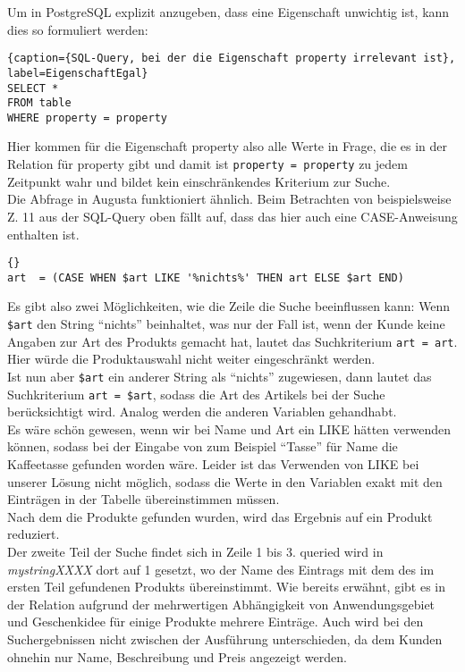 Um in PostgreSQL explizit anzugeben, dass eine Eigenschaft unwichtig ist, kann dies so formuliert werden:
\begin{lstlisting}{caption={SQL-Query, bei der die Eigenschaft property irrelevant ist}, label=EigenschaftEgal}
SELECT *
FROM table
WHERE property = property
\end{lstlisting}
Hier kommen für die Eigenschaft property also alle Werte in Frage, die es in der Relation für property gibt und damit ist \lstinline{property = property} zu jedem Zeitpunkt wahr und bildet kein einschränkendes Kriterium zur Suche.\\
Die Abfrage in Augusta funktioniert ähnlich. Beim Betrachten von beispielsweise Z. 11 aus der SQL-Query oben fällt auf, dass das hier auch eine CASE-Anweisung enthalten ist.
\begin{lstlisting}{}
art  = (CASE WHEN $art LIKE '%nichts%' THEN art ELSE $art END)
\end{lstlisting}
Es gibt also zwei Möglichkeiten, wie die Zeile die Suche beeinflussen kann: Wenn \lstinline|$art| den String "`nichts"' beinhaltet, was nur der Fall ist, wenn der Kunde keine Angaben zur Art des Produkts gemacht hat, lautet das Suchkriterium \lstinline|art = art|. Hier würde die Produktauswahl nicht weiter eingeschränkt werden.\\
Ist nun aber \lstinline|$art| ein anderer String als "`nichts"' zugewiesen, dann lautet das Suchkriterium \lstinline|art = $art|, sodass die Art des Artikels bei der Suche berücksichtigt wird. Analog werden die anderen Variablen gehandhabt.\\
Es wäre schön gewesen, wenn wir bei Name und Art ein LIKE hätten verwenden können, sodass bei der Eingabe von zum Beispiel "`Tasse"' für Name die Kaffeetasse gefunden worden wäre. Leider ist das Verwenden von LIKE bei unserer Lösung nicht möglich, sodass die Werte in den Variablen exakt mit den Einträgen in der Tabelle übereinstimmen müssen.\\
Nach dem die Produkte gefunden wurden, wird das Ergebnis auf ein Produkt reduziert.\\
Der zweite Teil der Suche findet sich in Zeile 1 bis 3. queried wird in \textit{mystringXXXX} dort auf 1 gesetzt, wo der Name des Eintrags mit dem des im ersten Teil gefundenen Produkts übereinstimmt. Wie bereits erwähnt, gibt es in der Relation aufgrund der mehrwertigen Abhängigkeit von Anwendungsgebiet und Geschenkidee für einige Produkte mehrere Einträge. Auch wird bei den Suchergebnissen nicht zwischen der Ausführung unterschieden, da dem Kunden ohnehin nur Name, Beschreibung und Preis angezeigt werden.\\


